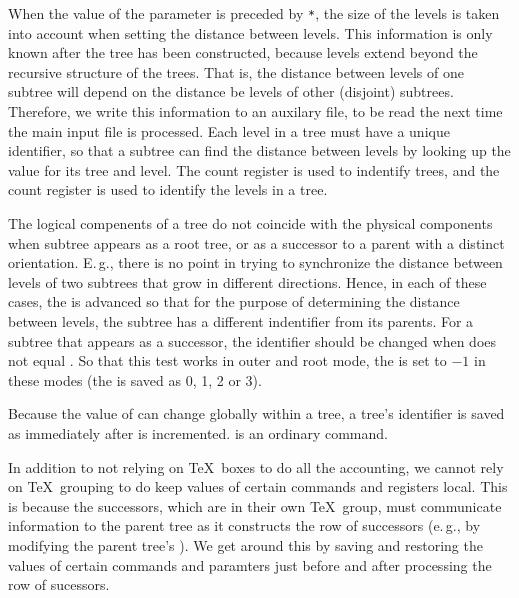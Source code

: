 \documentclass[11pt,english,BCOR10mm,DIV12,bibliography=totoc,parskip=false,smallheadings
    headexclude,footexclude,oneside]{pst-doc}
\begin{document}
When the value of the  parameter is preceded by \verb=*=, the size of the levels is taken into account 
when setting the distance between levels. This information is only known after the tree has been constructed, 
because levels extend beyond the recursive structure of the trees. That is, the distance between levels of one 
subtree will depend on the distance be levels of other (disjoint) subtrees. Therefore, we write this information 
to an auxilary file, to be read the next time the main input file is processed. Each level in a tree must have 
a unique identifier, so that a subtree can find the distance between levels by looking up the value for its 
tree and level. The count register  is used to indentify trees, and the count register  
is used to identify the levels in a tree.

The logical compenents of a tree do not coincide with the physical components when subtree appears as a root 
tree, or as a successor to a parent with a distinct orientation. E.\,g., there is no point in trying to synchronize 
the distance between levels of two subtrees that grow in different directions. Hence, in each of these cases, 
the  is advanced so that for the purpose of determining the distance between levels, the subtree has a 
different indentifier from its parents. For a subtree that appears as a successor, the identifier should be 
changed when  does not equal . So that this test works in outer and root mode, the 
 is set to $-1$ in these modes (the  is saved as 0, 1, 2 or 3).

Because the value of  can change globally within a tree, a tree's identifier is saved as  
immediately after  is incremented.  is an ordinary command.

In addition to not relying on \TeX\ boxes to do all the accounting, we cannot rely on \TeX\ grouping to do 
keep values of certain commands and registers local. This is because the successors, which are in their own 
\TeX\ group, must communicate information to the parent tree as it constructs the row of successors (e.\,g., 
by modifying the parent tree's ). We get around this by saving and restoring the values of 
certain commands and paramters just before and after processing the row of sucessors.
\end{document}
